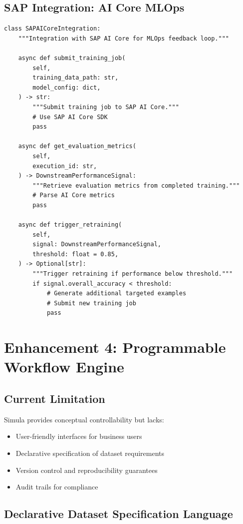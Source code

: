 \subsection{SAP Integration: AI Core MLOps}

\begin{lstlisting}[language=jsonx,caption={SAP AI Core integration for closed-loop training.}]
class SAPAICoreIntegration:
    """Integration with SAP AI Core for MLOps feedback loop."""
    
    async def submit_training_job(
        self,
        training_data_path: str,
        model_config: dict,
    ) -> str:
        """Submit training job to SAP AI Core."""
        # Use SAP AI Core SDK
        pass
    
    async def get_evaluation_metrics(
        self,
        execution_id: str,
    ) -> DownstreamPerformanceSignal:
        """Retrieve evaluation metrics from completed training."""
        # Parse AI Core metrics
        pass
    
    async def trigger_retraining(
        self,
        signal: DownstreamPerformanceSignal,
        threshold: float = 0.85,
    ) -> Optional[str]:
        """Trigger retraining if performance below threshold."""
        if signal.overall_accuracy < threshold:
            # Generate additional targeted examples
            # Submit new training job
            pass
\end{lstlisting}


\section{Enhancement 4: Programmable Workflow Engine}

\subsection{Current Limitation}

Simula provides conceptual controllability but lacks:
\begin{itemize}
  \item User-friendly interfaces for business users
  \item Declarative specification of dataset requirements
  \item Version control and reproducibility guarantees
  \item Audit trails for compliance
\end{itemize}

\subsection{Declarative Dataset Specification Language}

